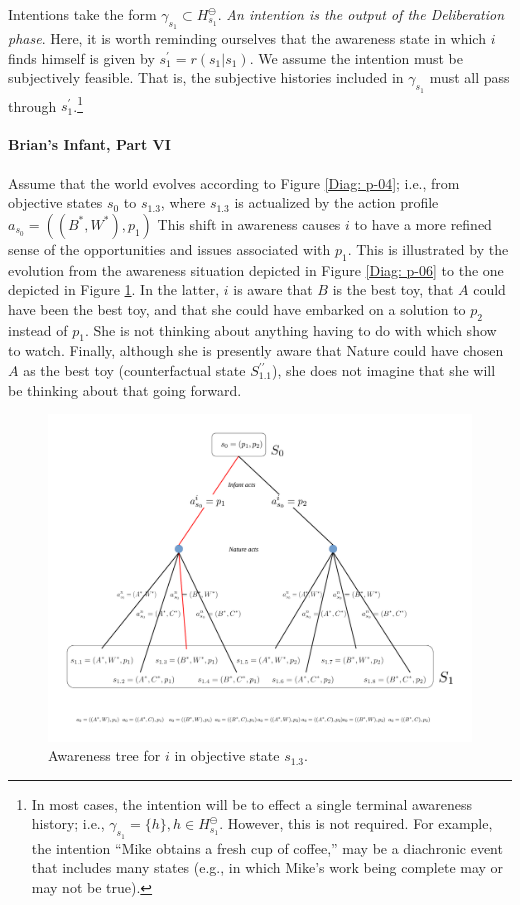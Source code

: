 \documentclass[
11pt,
titlepage,
reqno,
]{article}%
\theoremstyle{definition}
\begin{document}
Intentions take the form $\gamma_{s_1}\subset H^\ominus_{s_1}$.
\textit{An intention is the output of the Deliberation phase}.
Here, it is worth reminding ourselves that the awareness state in which $i$ finds himself is given by $s^\prime_1=r(s_1|s_1)$.
We assume the intention must be subjectively feasible.
That is, the subjective histories included in $\gamma_{s_1}$ must all pass through $s^\prime_1$.\footnote
{
	In most cases, the intention will be to effect a single terminal awareness history; i.e., $\gamma_{s_1}=\{h\}, h\in H^\ominus_{s_1}$. 
	However, this is not required. 
	For example, the intention ``Mike obtains a fresh cup of coffee,'' may be a diachronic event that includes many states (e.g., in which Mike's work being complete may or may not be true).
}
 

\paragraph{Brian's Infant, Part VI}
Assume that the world evolves according to Figure \ref{Diag: p-04}; i.e., from objective states $s_0$ to $s_{1.3}$, where $s_{1.3}$ is actualized by the action profile $a_{s_0}=((B^\ast,W^\ast),p_1)$
This shift in awareness causes $i$ to have a more refined sense of the opportunities and issues associated with $p_1$.
This is illustrated by the evolution from the awareness situation depicted in Figure \ref{Diag: p-06} to the one depicted in Figure \ref{Diag: p-07}. 
In the latter, $i$ is aware that $B$ is the best toy, that $A$ could have been the best toy, and that she could have embarked on a solution to $p_2$ instead of $p_1$. 
She is not thinking about anything having to do with which show to watch.
Finally, although she is presently aware that Nature could have chosen $A$ as the best toy (counterfactual state $S^{\prime\prime}_{1.1}$),
she does not imagine that she will be thinking about that going forward.

\begin{figure}[h!]
	\centering
	\includegraphics*[page=7,trim = 3in 0in 1in 0in,scale=.7]{Awareness_Diagrams_All}
	\caption{Awareness tree for $i$ in objective state $s_{1.3}$.\label{Diag: p-07}}%
\end{figure}
\end{document}
